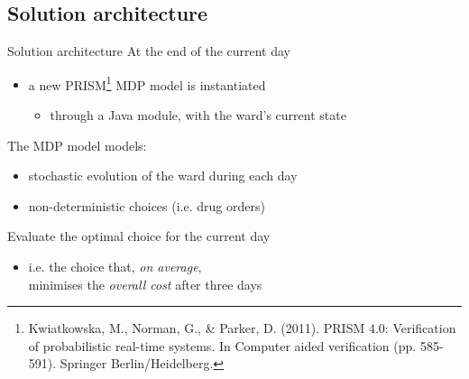   \subsection{Solution architecture}
    \begin{frame}{Solution architecture}
      At the end of the current day
      \begin{itemize}
        \item a new PRISM\footnote{Kwiatkowska, M., Norman, G., \& Parker, D. (2011). PRISM 4.0: Verification of probabilistic real-time systems. In Computer aided verification (pp. 585-591). Springer Berlin/Heidelberg.} MDP model is instantiated
        \begin{itemize}
          \item through a Java module, with the ward's current state
        \end{itemize}
      \end{itemize}
      
      \vspace{0.5em}
      The MDP model models:
      \begin{itemize}
        \item stochastic evolution of the ward during each day
        \item non-deterministic choices (i.e. drug orders)
      \end{itemize}

      \begin{center}\scalebox{0.8}{}\end{center}
      
      Evaluate the optimal choice for the current day
      \begin{itemize}
        \item i.e. the choice that, \textit{on average},\\
          minimises the \textit{overall cost} after three days
      \end{itemize}
    \end{frame}
    
